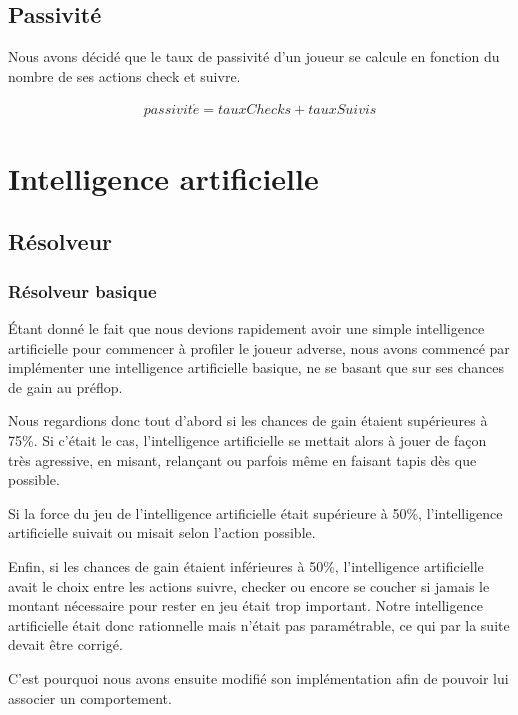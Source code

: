 \documentclass{report}
\begin{document}
\section{Passivité}

\hspace{0.5cm}Nous avons décidé que le taux de passivité d'un joueur se calcule en fonction du nombre de ses actions check et suivre.\par
\begin{align*}
	passivit\acute{e}=tauxChecks+tauxSuivis
\end{align*}


\chapter{Intelligence artificielle}
\section{Résolveur}
\subsection{Résolveur basique}


Étant donné le fait que nous devions rapidement avoir une simple intelligence artificielle pour commencer à profiler le joueur adverse, nous avons commencé par implémenter une intelligence artificielle basique, ne se basant que sur ses chances de gain au préflop.\par 
Nous regardions donc tout d'abord si les chances de gain étaient supérieures à 75\%. Si c'était le cas, l'intelligence artificielle se mettait alors à jouer de façon très agressive, en misant, relançant ou parfois même en faisant tapis dès que possible.\par
Si la force du jeu de l'intelligence artificielle était supérieure à 50\%, l'intelligence artificielle suivait ou misait selon l'action possible.\par
Enfin, si les chances de gain étaient inférieures à 50\%, l'intelligence artificielle avait le choix entre les actions suivre, checker ou encore se coucher si jamais le montant nécessaire pour rester en jeu était trop important. Notre intelligence artificielle était donc rationnelle mais n'était pas paramétrable, ce qui par la suite devait être corrigé. \par
C'est pourquoi nous avons ensuite modifié son implémentation afin de pouvoir lui associer un comportement.\par
\end{document}
